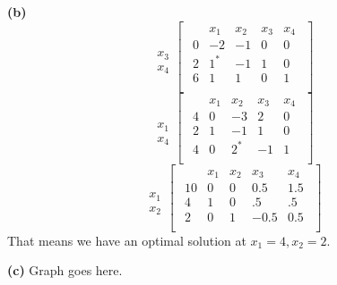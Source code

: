 \documentclass[12pt]{article}
\newenvironment{problem}[2][Problem]{\begin{trivlist}
\item[\hskip \labelsep {\bfseries #1}\hskip \labelsep {\bfseries #2.}]}{\end{trivlist}}
\newenvironment{subproblem}[1]{\textbf{(#1)}}{}
\theoremstyle{definition}
\begin{document}
\begin{problem}{3.12}
\begin{subproblem}{b}
\begin{equation}
\begin{array}{c}
\\
  \\
x_3 \\
x_4
\end{array}
\begin{bmatrix}
\begin{array}{c|cccc}
    & x_1 & x_2 & x_3 & x_4 \\ \hline
  0 & -2 & -1 & 0 & 0 \\ \hline
  2 & 1^* & -1 & 1 & 0  \\
  6 & 1 & 1 & 0 & 1 \\
\end{array}
\end{bmatrix}
\end{equation}
$ $ \\
\begin{equation}
\begin{array}{c}
\\
  \\
x_1 \\
x_4
\end{array}
\begin{bmatrix}
\begin{array}{c|cccc}
    & x_1 & x_2 & x_3 & x_4 \\ \hline
  4 & 0 & -3 & 2 & 0 \\ \hline
  2 & 1 & -1 & 1 & 0  \\
  4 & 0 & 2^* & -1 & 1 \\
\end{array}
\end{bmatrix}
\end{equation}
$ $ \\
\begin{equation}
\begin{array}{c}
\\
  \\
x_1 \\
x_2
\end{array}
\begin{bmatrix}
\begin{array}{c|cccc}
    & x_1 & x_2 & x_3 & x_4 \\ \hline
  10 & 0 & 0 & 0.5 & 1.5 \\ \hline
  4 & 1 & 0 & .5 & .5  \\
  2 & 0 & 1 & -0.5 & 0.5 \\
\end{array}
\end{bmatrix}
\end{equation}
That means we have an optimal solution at $x_1=4, x_2=2$.

\end{subproblem}

\begin{subproblem}{c}
Graph goes here.
\end{subproblem}


\end{problem}
\end{document}
